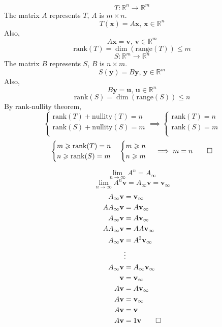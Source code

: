 \documentclass[a4paper]{article}
\newcommand{\vv}{\mathbf}
\newcommand{\rank}{\mathrm{rank}}
\newcommand{\range}{\mathrm{range}}
\newcommand{\nullity}{\mathrm{nullity}}
\begin{document}
\[T:\mathbb R^n\to\mathbb R^m\]
The matrix \(A\) represents \(T\), \(A\) is \(m\times n\).
\[T(\vv x)=A\vv x,\, \vv x\in\mathbb R^n\]
Also,
\[A\vv x=\vv v,\, \vv v \in\mathbb R^m\]
\[\rank(T)=\dim(\range(T))\leqslant m\]
\[S:\mathbb R^m\to\mathbb R^n\]
The matrix \(B\) represents \(S\), \(B\) is \(n\times m\).
\[S(\vv y)=B\vv y,\, \vv y\in\mathbb R^m\]
Also,
\[B\vv y=\vv u,\, \vv u \in\mathbb R^n\]
\[\rank(S)=\dim(\range(S))\leqslant n\]
By rank-nullity theorem,
\[
    \begin{cases}
    \rank(T)+\nullity(T)=n\\
    \rank(S)+\nullity(S)=m\\
\end{cases}
\implies
    \begin{cases}
    \rank(T)=n\\
    \rank(S)=m\\
    \end{cases}\]
\[
    \begin{cases}
    m\geqslant\rank(T)=n\\
    n\geqslant\rank(S)=m\\
\end{cases}
    \begin{cases}
    m\geqslant n\\
    n\geqslant m\\
\end{cases}
\implies m=n\qed
\]

\[\lim\limits_{n\to\infty}A^n=A_\infty\]
\[\lim\limits_{n\to\infty}A^n\vv v=A_\infty\vv v=\vv v_\infty\]
\[\begin{aligned}
    A_\infty\vv v&=\vv v_\infty\\
    AA_\infty\vv v&=A\vv v_\infty\\
    A_\infty\vv v&=A\vv v_\infty\\
    AA_\infty\vv v&=AA\vv v_\infty\\
    A_\infty\vv v&=A^2\vv v_\infty\\
    &\vdots\\
    A_\infty\vv v&=A_\infty\vv v_\infty\\
    \vv v&=\vv v_\infty\\
    A\vv v&=A\vv v_\infty\\
    A\vv v&=\vv v_\infty\\
    A\vv v&=\vv v\\
    A\vv v&=1\vv v\qed\\
\end{aligned}\]
\end{document}
